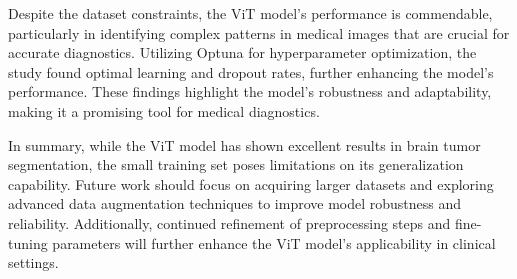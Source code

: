 Despite the dataset constraints, the ViT model's performance is commendable, particularly in identifying complex patterns in medical images that are crucial for accurate diagnostics. Utilizing Optuna for hyperparameter optimization, the study found optimal learning and dropout rates, further enhancing the model's performance. These findings highlight the model's robustness and adaptability, making it a promising tool for medical diagnostics.

In summary, while the ViT model has shown excellent results in brain tumor segmentation, the small training set poses limitations on its generalization capability. Future work should focus on acquiring larger datasets and exploring advanced data augmentation techniques to improve model robustness and reliability. Additionally, continued refinement of preprocessing steps and fine-tuning parameters will further enhance the ViT model's applicability in clinical settings.
